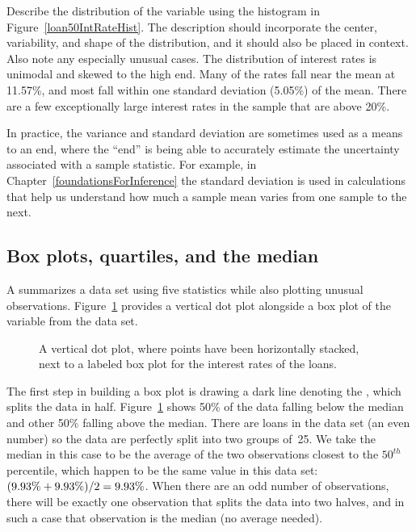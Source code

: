 \begin{examplewrap}
\begin{nexample}{Describe the distribution of the
     variable using
    the histogram in Figure~\ref{loan50IntRateHist}.
    The description should incorporate the center,
    variability, and shape of the distribution,
    and it should also be placed in context.
    Also note any especially unusual cases.}
  The distribution of interest rates is unimodal
  and skewed to the high end.
  Many of the rates fall near the mean at 11.57\%,
  and most fall within one standard deviation (5.05\%)
  of the mean.
  There are a few exceptionally large interest rates
  in the sample that are above 20\%.
\end{nexample}
\end{examplewrap}

In practice, the variance and standard deviation are sometimes
used as a means to an end, where the ``end'' is being able to
accurately estimate the uncertainty associated with a sample
statistic.
For example, in Chapter~\ref{foundationsForInference}
the standard deviation is used in calculations that help us
understand how much a sample mean varies from one sample
to the next.


\subsection{Box plots, quartiles, and the median}

A  summarizes a data set using five
statistics while also plotting unusual observations.
Figure~\ref{loan_int_rate_box_plot_layout} provides
a vertical dot plot alongside a box plot of the
 variable from
the  data set.

\begin{figure}[h]
  \centering
  \caption{A vertical dot plot, where points have been
      horizontally stacked, next to a labeled box plot
      for the interest rates of the \loanN{} loans.}
  \label{loan_int_rate_box_plot_layout}
\end{figure}

The first step in building a box plot is drawing a dark line
denoting the , which splits the data in half.
Figure~\ref{loan_int_rate_box_plot_layout} shows 50\% of the
data falling below the median and other 50\% falling above
the median.
There are \loanN{} loans in the data set
(an even number) so the data are perfectly split into two
groups of~25.
We take the median in this case to be the average of the
two observations closest to the $50^{th}$ percentile,
which happen to be the same value in this data set:
$(\text{9.93\%{}} + \text{9.93\%{}}) / 2
  = \text{9.93\%{}}$.
When there are an odd number of observations,
there will be exactly one observation that splits the data
into two halves, and in such a case that observation
is the median (no average needed).

